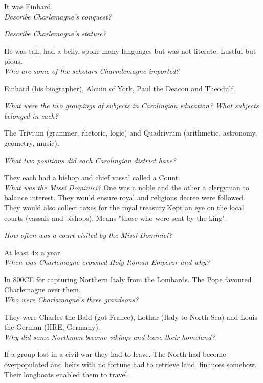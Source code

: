 \documentclass[12pt]{article}
\begin{document}
It was Einhard.\\

\textit{Describe Charlemagne's conquest?}

\textit{Describe Charlemagne's stature?}

He was tall, had a belly, spoke many languages but was not literate. Lustful but pious.\\

\textit{Who are some of the scholars Charmlemagne imported?}

Einhard (his biographer), Alcuin of York, Paul the Deacon and Theodulf.

\textit{What were the two groupings of subjects in Carolingian education? What subjects belonged in each?}

The Trivium (grammer, rhetoric, logic) and Quadrivium (arithmetic, astronomy, geometry, music).

\textit{What two positions did each Carolingian district have?}

They each had a bishop and chief vassal called a Count.\\

\textit{What was the Missi Dominici?}
One was a noble and the other a clergyman to balance interest. They would ensure royal and religious decree were followed. They would also collect taxes for the royal treasury.Kept an eye on the local courts (vassals and bishops).
Means "those who were sent by the king". 

\textit{How often was a court visited by the Missi Dominici?}

At least 4x a year.\\

\textit{When was Charlemagne crowned Holy Roman Emperor and why?}

In 800CE for capturing Northern Italy from the Lombards. The Pope favoured Charlemagne over them.\\

\textit{Who were Charlamagne's three grandsons?}

They were Charles the Bald (got France), Lothar (Italy to North Sea) and Louis the German (HRE, Germany).\\

\textit{Why did some Northmen become vikings and leave their homeland?}

If a group lost in a civil war they had to leave. The North had become overpopulated and heirs with no fortune had to retrieve land, finances somehow. Their longboats enabled them to travel.\\
\end{document}
